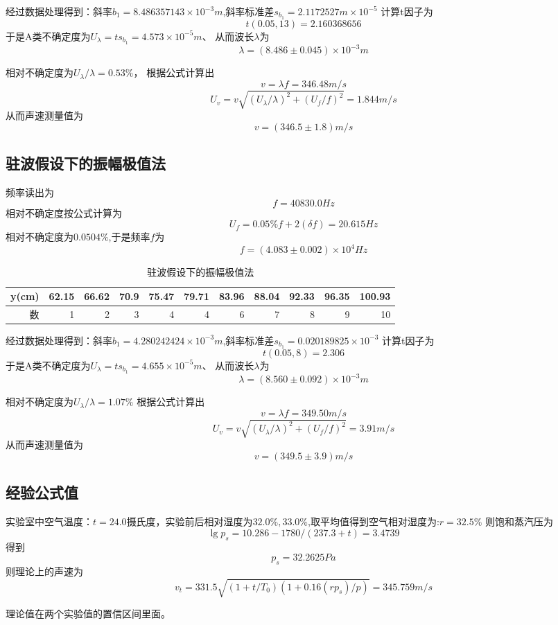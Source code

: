 \documentclass[12pt,a4paper]{ctexart}
\begin{document}
经过数据处理得到：斜率$b_1=8.486357143\times 10^{-3}m$,斜率标准差$s_{b_1}=2.1172527m\times 10^{-5}$
计算t因子为
$$t(0.05,13)=2.160368656$$
于是A类不确定度为$U_{\lambda}=ts_{b_1}=4.573\times 10^{-5}m$、
从而波长$\lambda$为
$$\lambda=(8.486\pm0.045)\times 10^{-3}m$$

相对不确定度为$U_{\lambda}/\lambda=0.53\%$，
根据公式计算出
$$v=\lambda f=346.48m/s$$
$$U_v=v\sqrt{(U_{\lambda}/\lambda)^2 +(U_f/f)^2}=1.844m/s$$
从而声速测量值为
$$v=(346.5\pm1.8) m/s$$
\subsection{驻波假设下的振幅极值法}
频率读出为
$$f=40830.0Hz$$
相对不确定度按公式计算为
$$U_f = 0.05\%f + 2(\delta f )=20.615Hz$$
相对不确定度为$0.0504\%$,于是频率$f$为
$$f=(4.083\pm0.002)\times 10^4 Hz$$
\begin{table}[htbp]
  \centering
  \caption{驻波假设下的振幅极值法}
    \begin{tabular}{r|r|r|r|r|r|r|r|r|r|r}
    \toprule
    y(cm) & 62.15 & 66.62 & 70.9  & 75.47 & 79.71 & 83.96 & 88.04 & 92.33 & 96.35 & 100.93 \\
    \midrule
    数     & 1    & 2    & 3    & 4    & 4    & 6    & 7    & 8    & 9    & 10 \\
    \bottomrule
    \end{tabular}%
  \label{tab:addlabel}%
\end{table}%


经过数据处理得到：斜率$b_1=4.280242424\times 10^{-3}m$,斜率标准差$s_{b_1}=0.020189825\times 10^{-3}$
计算t因子为
$$t(0.05,8)=2.306$$
于是A类不确定度为$U_{\lambda}=ts_{b_1}=4.655\times 10^{-5}m$、
从而波长$\lambda$为
$$\lambda=(8.560\pm0.092)\times 10^{-3}m$$

相对不确定度为$U_{\lambda}/\lambda=1.07\%$
根据公式计算出
$$v=\lambda f=349.50m/s$$
$$U_v=v\sqrt{(U_{\lambda}/\lambda)^2 +(U_f/f)^2}=3.91m/s$$
从而声速测量值为
$$v=(349.5\pm3.9) m/s$$

\subsection{经验公式值}
实验室中空气温度：$t =24.0$摄氏度，实验前后相对湿度为$32.0\%,33.0\%$,取平均值得到空气相对湿度为:$r =32.5\%$
则饱和蒸汽压为
$$\lg{p_s} =10.286 - 1780/(237.3+t) =3.4739$$
得到$$p_s=32.2625Pa$$
则理论上的声速为
$$v_t = 331.5\sqrt{(1+t/T_0 ) (1+0.16(rp_s)/p)}=345.759 m/s$$

理论值在两个实验值的置信区间里面。
\end{document}

